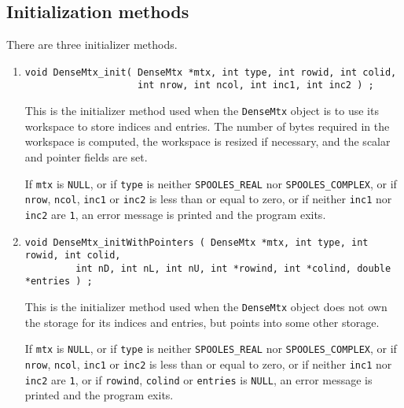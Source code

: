 \subsection{Initialization methods}
\label{subsection:DenseMtx:proto:initial}
\par
There are three initializer methods.
\par
\begin{enumerate}
\item
\begin{verbatim}
void DenseMtx_init( DenseMtx *mtx, int type, int rowid, int colid,
                    int nrow, int ncol, int inc1, int inc2 ) ;
\end{verbatim}
This is the initializer method used when the {\tt DenseMtx}
object is to use its workspace to store indices and entries.
The number of bytes required in the workspace is computed,
the workspace is resized if necessary, and the scalar and pointer
fields are set.
\par {}
If {\tt mtx} is {\tt NULL},
or if {\tt type} is neither {\tt SPOOLES\_REAL}
nor {\tt SPOOLES\_COMPLEX},
or if {\tt nrow}, {\tt ncol}, {\tt inc1} or {\tt inc2}
is less than or equal to zero,
or if neither {\tt inc1} nor {\tt inc2} are {\tt 1},
an error message is printed and the program exits.
\item
\begin{verbatim}
void DenseMtx_initWithPointers ( DenseMtx *mtx, int type, int rowid, int colid, 
         int nD, int nL, int nU, int *rowind, int *colind, double *entries ) ;
\end{verbatim}
This is the initializer method used when the {\tt DenseMtx}
object does not own the storage for its indices and entries,
but points into some other storage.
\par {}
If {\tt mtx} is {\tt NULL},
or if {\tt type} is neither {\tt SPOOLES\_REAL}
nor {\tt SPOOLES\_COMPLEX},
or if {\tt nrow}, {\tt ncol}, {\tt inc1} or {\tt inc2}
is less than or equal to zero,
or if neither {\tt inc1} nor {\tt inc2} are {\tt 1},
or if {\tt rowind}, {\tt colind} or {\tt entries} is {\tt NULL},
an error message is printed and the program exits.

\end{enumerate}
